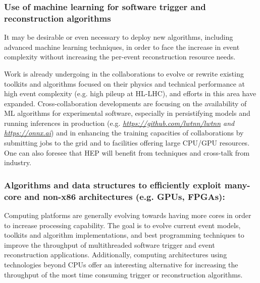 \documentclass[10pt,a4paper]{article}
\begin{document}
\hypertarget{use-of-machine-learning-for-software-trigger-and-reconstruction-algorithms}{%
\subsubsection{Use of machine learning for software trigger and
reconstruction
algorithms}\label{use-of-machine-learning-for-software-trigger-and-reconstruction-algorithms}}

It may be desirable or even necessary to deploy new algorithms,
including advanced machine learning techniques, in order to face the
increase in event complexity without increasing the per-event
reconstruction resource needs.

Work is already undergoing in the collaborations to evolve or rewrite
existing toolkits and algorithms focused on their physics and technical
performance at high event complexity (e.g. high pileup at HL-LHC), and
efforts in this area have expanded. Cross-collaboration developments are
focusing on the availability of ML algorithms for experimental software,
especially in persistifying models and running inferences in production
(e.g.
\emph{\href{https://github.com/lwtnn/lwtnn}{{https://github.com/lwtnn/lwtnn}}
and \href{https://onnx.ai}{{https://onnx.ai}}}) and in enhancing the
training capacities of collaborations by submitting jobs to the grid and
to facilities offering large CPU/GPU resources. One can also foresee
that HEP will benefit from techniques and cross-talk from industry.

\hypertarget{algorithms-and-data-structures-to-efficiently-exploit-many-core-and-non-x86-architectures-e.g.-gpus-fpgas}{%
\subsubsection{\texorpdfstring{Algorithms and data structures to
efficiently exploit many-core and non-x86 architectures (e.g. GPUs,
FPGAs):
}{Algorithms and data structures to efficiently exploit many-core and non-x86 architectures (e.g. GPUs, FPGAs): }}\label{algorithms-and-data-structures-to-efficiently-exploit-many-core-and-non-x86-architectures-e.g.-gpus-fpgas}}

Computing platforms are generally evolving towards having more cores in
order to increase processing capability. The goal is to evolve current
event models, toolkits and algorithm implementations, and best
programming techniques to improve the throughput of multithreaded
software trigger and event reconstruction applications. Additionally,
computing architectures using technologies beyond CPUs offer an
interesting alternative for increasing the throughput of the most time
consuming trigger or reconstruction algorithms.
\end{document}
